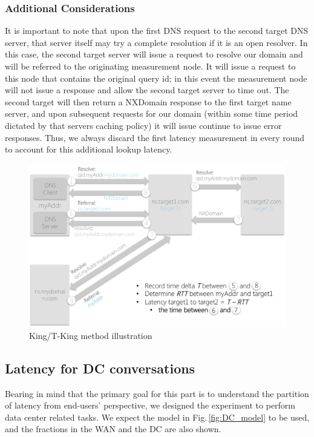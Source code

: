 \subsubsection{Additional Considerations}
It is important to note that upon the first DNS request to the second target DNS server, that server itself may try a complete resolution if it is an open resolver. In this case, the second target server will issue a request to resolve our domain and will be referred to the originating measurement node. It will issue a request to this node that contains the original query id; in this event the measurement node will not issue a response and allow the second target server to time out. The second target will then return a NXDomain response to the first target name server, and upon subsequent requests for our domain (within some time period dictated by that servers caching policy) it will issue continue to issue error responses. Thus, we always discard the first latency measurement in every round to account for this additional lookup latency.

\begin{figure}
  \centering
  \includegraphics[width=\linewidth]{../figs/king_model.pdf}
  \caption{King/T-King method illustration}
  \label{fig:king_model}
\end{figure}



\subsection{Latency for DC conversations}
\label{sec:latency-dc-conv}
Bearing in mind that the primary goal for this part is to understand the partition of latency from end-users' perspective, we designed the experiment to perform data center related tasks. We expect the model in Fig.\,\ref{fig:DC_model} to be used, and the fractions in the WAN and the DC are also shown. 

